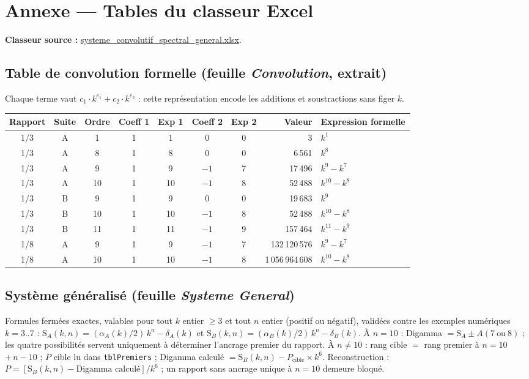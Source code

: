 \documentclass[11pt,a4paper]{article}
\newcommand{\SA}{\mathrm{S}_A}
\newcommand{\SB}{\mathrm{S}_B}
\begin{document}
\clearpage
\appendix
\section{Annexe --- Tables du classeur Excel}

\textbf{Classeur source :} \url{systeme_convolutif_spectral_general.xlsx}.

\subsection{Table de convolution formelle (feuille \emph{Convolution}, extrait)}

Chaque terme vaut $c_1 \cdot k^{e_1} + c_2 \cdot k^{e_2}$ : cette
représentation encode les additions et soustractions sans figer $k$.

\begin{center}\small
\begin{tabular}{@{}c c c c c c c r l@{}}
\toprule
\rowcolor{spectralgris}
Rapport & Suite & Ordre & Coeff 1 & Exp 1 & Coeff 2 & Exp 2 & Valeur & Expression formelle \\
\midrule
1/3 & A & 1 & 1 & 1 & 0 & 0 & 3 & $k^{1}$ \\
1/3 & A & 8 & 1 & 8 & 0 & 0 & 6\,561 & $k^{8}$ \\
1/3 & A & 9 & 1 & 9 & $-1$ & 7 & 17\,496 & $k^{9} - k^{7}$ \\
1/3 & A & 10 & 1 & 10 & $-1$ & 8 & 52\,488 & $k^{10} - k^{8}$ \\
1/3 & B & 9 & 1 & 9 & 0 & 0 & 19\,683 & $k^{9}$ \\
1/3 & B & 10 & 1 & 10 & $-1$ & 8 & 52\,488 & $k^{10} - k^{8}$ \\
1/3 & B & 11 & 1 & 11 & $-1$ & 9 & 157\,464 & $k^{11} - k^{9}$ \\
1/8 & A & 9 & 1 & 9 & $-1$ & 7 & 132\,120\,576 & $k^{9} - k^{7}$ \\
1/8 & A & 10 & 1 & 10 & $-1$ & 8 & 1\,056\,964\,608 & $k^{10} - k^{8}$ \\
\bottomrule
\end{tabular}
\end{center}

\subsection{Système généralisé (feuille \emph{Systeme General})}

Formules fermées exactes, valables pour tout $k$ entier $\ge 3$ et tout $n$
entier (positif ou négatif), validées contre les exemples numériques $k=3..7$ :
$\SA(k,n) = (\alpha_A(k)/2)\,k^{n} - \delta_A(k)$ et
$\SB(k,n) = (\alpha_B(k)/2)\,k^{n} - \delta_B(k)$. À $n=10$ : Digamma $= \SA
\pm A(7\ \text{ou}\ 8)$ ; les quatre possibilités servent uniquement à
déterminer l'ancrage premier du rapport. À $n \neq 10$ : rang cible $=$ rang
premier à $n=10$ $+\,n-10$ ; $P$ cible lu dans \texttt{tblPremiers} ; Digamma
calculé $= \SB(k,n) - P_{\text{cible}} \times k^{6}$. Reconstruction :
$P = [\SB(k,n) - \text{Digamma calculé}]/k^{6}$ ; un rapport sans ancrage
unique à $n=10$ demeure bloqué.
\end{document}
